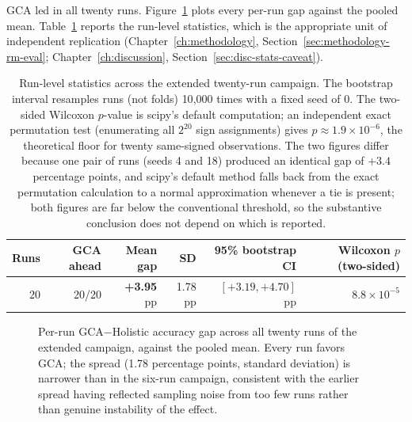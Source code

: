 GCA led in all twenty runs. Figure~\ref{fig:seed-campaign-20} plots every
per-run gap against the pooled mean. Table~\ref{tab:seed-campaign-stats}
reports the run-level statistics, which is the appropriate unit of independent
replication (Chapter~\ref{ch:methodology}, Section~\ref{sec:methodology-rm-eval};
Chapter~\ref{ch:discussion}, Section~\ref{sec:disc-stats-caveat}).

\begin{table}[htbp]
\centering
\caption[Run-level statistics, extended twenty-run campaign]{Run-level statistics across the extended twenty-run campaign. The
bootstrap interval resamples runs (not folds) 10{,}000 times with a fixed seed
of 0. The two-sided Wilcoxon $p$-value is scipy's default computation; an
independent exact permutation test (enumerating all $2^{20}$ sign
assignments) gives $p \approx 1.9\times10^{-6}$, the theoretical floor for
twenty same-signed observations. The two figures differ because one pair of
runs (seeds 4 and 18) produced an identical gap of $+3.4$ percentage points,
and scipy's default method falls back from the exact permutation calculation
to a normal approximation whenever a tie is present; both figures are
far below the conventional threshold, so the substantive conclusion does not
depend on which is reported.}
\label{tab:seed-campaign-stats}
\begin{tabular}{rrrrrr}
\toprule
Runs & GCA ahead & Mean gap & SD & 95\% bootstrap CI & Wilcoxon $p$ (two-sided) \\
\midrule
20 & 20/20 & \textbf{+3.95} pp & 1.78 pp & $[+3.19, +4.70]$ pp & $8.8\times10^{-5}$ \\
\bottomrule
\end{tabular}
\end{table}

\begin{figure}[htbp]
\centering
{}
\caption[Per-run GCA$-$Holistic accuracy gap, twenty-run campaign]{Per-run GCA$-$Holistic accuracy gap across all twenty runs of the
extended campaign, against the pooled mean. Every run favors GCA; the spread
(1.78 percentage points, standard deviation) is narrower than in the six-run
campaign, consistent with the earlier spread having reflected sampling noise
from too few runs rather than genuine instability of the effect.}
\label{fig:seed-campaign-20}
\end{figure}

